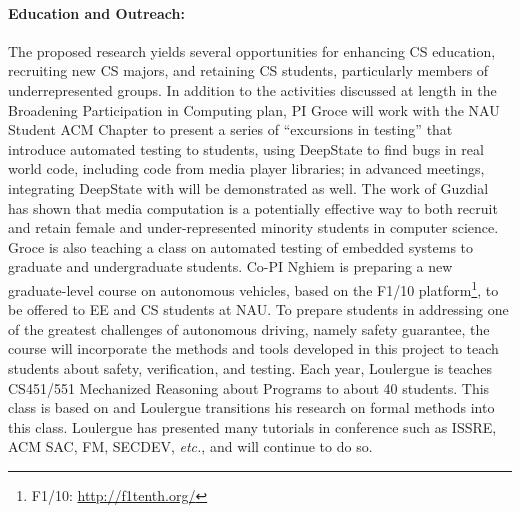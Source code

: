 \paragraph{Education and Outreach:}
The proposed research yields several opportunities for enhancing CS
education, recruiting new CS majors, and retaining CS students,
particularly members of underrepresented groups.  In addition to the
activities discussed at length in the Broadening Participation in Computing plan,
PI Groce will work with the NAU Student ACM Chapter to present a
series of ``excursions in testing'' that introduce automated testing
to students, using DeepState to find bugs in real world code, including code from
media player libraries; in advanced meetings, integrating DeepState
with \framac will be demonstrated as well.  The work of Guzdial
\cite{Guzdial} has shown that media computation is a
potentially effective way to both recruit and retain female and
under-represented minority students in computer science. Groce is also teaching a
class on automated testing of embedded systems to graduate and
undergraduate students.
Co-PI Nghiem is preparing a new graduate-level course on autonomous vehicles, based on the F1/10 platform\footnote{F1/10: \url{http://f1tenth.org/}}, to be offered to EE and CS students at NAU.
To prepare students in addressing one of the greatest challenges of autonomous driving, namely safety guarantee, the course will incorporate the methods and tools developed in this project to teach students about safety, verification, and testing.
Each year, Loulergue is teaches CS451/551 Mechanized Reasoning about Programs to about 40 students.
This class is based on \framac and Loulergue transitions his research on formal methods into this class.
Loulergue has presented many \framac tutorials in conference such as ISSRE, ACM SAC, FM, SECDEV, {\it etc.}, and will continue to do so.

